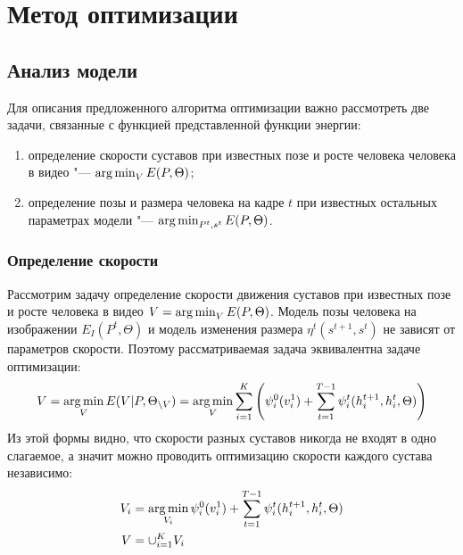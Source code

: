 \section{Метод оптимизации}

\subsection{Анализ модели}

\label{subsec::model_analysis}

Для описания предложенного алгоритма оптимизации важно рассмотреть две задачи, связанные с функцией представленной функции энергии:
\begin{enumerate}
	\item определение скорости суставов при известных позе и росте человека человека в видео "--- $\operatorname*{arg\,min}_{V} E(P, \Theta)$;
	\item определение позы и размера человека на кадре $t$ при известных остальных параметрах модели "--- $\operatorname*{arg\,min}_{P^t, s^t} E(P, \Theta)$.
\end{enumerate}

\subsubsection{Определение скорости}

Рассмотрим задачу определение скорости движения суставов при известных позе и росте человека в видео $V = \operatorname*{arg\,min}_{V} E(P, \Theta)$. Модель позы человека на изображении $E_I(P^t, \Theta)$ и модель изменения размера $\eta^t(s^{t+1}, s^t)$ не зависят от параметров скорости. Поэтому рассматриваемая задача эквивалентна задаче оптимизации:
\begin{equation}
	V = \operatorname*{arg\,min}_V E(V|P, \Theta_{\backslash V}) = \operatorname*{arg\,min}_V {\sum_{i=1}^K\left(\psi^0_i(v^1_i) + \sum_{t=1}^{T-1}\psi_i^t(h_i^{t+1}, h_i^{t}, \Theta) \right)}
\end{equation}
Из этой формы видно, что скорости разных суставов никогда не входят в одно слагаемое, а значит можно проводить оптимизацию скорости каждого сустава независимо:
\begin{equation}
	\begin{aligned}
		V_i &= \operatorname*{arg\,min}_{V_i} \psi^0_i(v^1_i) + \sum_{t=1}^{T-1}\psi_i^t(h_i^{t+1}, h_i^{t}, \Theta) \\
		V &= \cup_{i=1}^K V_i
	\end{aligned}
\end{equation}

